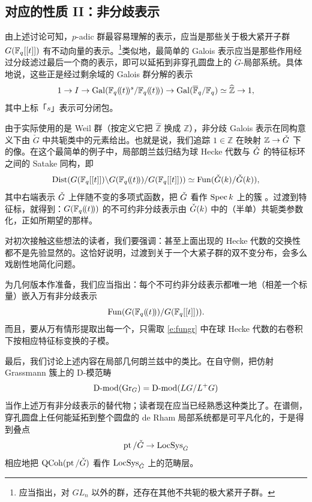 \subsection{对应的性质 II：非分歧表示}

\ssszh 由上述讨论可知，$p$-adic 群最容易理解的表示，应当是那些关于极大紧开子群 $G(\mathbb{F}_q[[t]])$ 有不动向量的表示。\footnote{应当指出，对 $GL_n$ 以外的群，还存在其他不共轭的极大紧开子群。}类似地，最简单的 Galois 表示应当是那些作用经过分歧滤过最后一个商的表示，即可以延拓到非穿孔圆盘上的 $\check{G}$-局部系统。具体地说，这些正是经过剩余域的 Galois 群分解的表示
%
\begin{equation} \label{e:galunramified}
 1 \rightarrow I \rightarrow \operatorname{Gal}( \mathbb{F}_q(\!(t)\!)^s / \mathbb{F}_q(\!(t)\!)) \rightarrow
 \operatorname{Gal}(\overline{\mathbb{F}}_q /
 \mathbb{F}_q) \simeq \widehat{\mathbb{Z}} \rightarrow 1,
\end{equation}
%
其中上标「$s$」表示可分闭包。

由于实际使用的是 Weil 群（按定义它把 $\widehat{\mathbb{Z}}$ 换成 $\mathbb{Z}$），非分歧 Galois 表示在同构意义下由 $\check{G}$ 中共轭类中的元素给出。也就是说，我们追踪 $1 \in \mathbb{Z}$ 在映射 $\mathbb{Z} \rightarrow \check{G}$ 下的像。在这个最简单的例子中，局部朗兰兹归结为球 Hecke 代数与 $\check{G}$ 的特征标环之间的 Satake 同构，即
%
\[    \operatorname{Dist}(G(\mathbb{F}_q[[t]]) \backslash G(\mathbb{F}_q(\!(t)\!)) / G(\mathbb{F}_q[[t]])) \simeq
\operatorname{Fun}(\check{G}(k) / \check{G}(k)),
\]
%
其中右端表示 $\check{G}$ 上伴随不变的多项式函数，把 $\check{G}$ 看作 $\operatorname{Spec} k$ 上的簇 \cite{satake63}。过渡到特征标，就得到：$G(\mathbb{F}_q(\!(t)\!))$ 的不可约非分歧表示由 $\check{G}(k)$ 中的（半单）共轭类参数化，正如所期望的那样。

\begin{re} 对初次接触这些想法的读者，我们要强调：甚至上面出现的 Hecke 代数的交换性都不是先验显然的。这恰好说明，过渡到关于一个大紧子群的双不变分布，会多么戏剧性地简化问题。\end{re}

\ssszh 为几何版本作准备，我们应当指出：每个不可约非分歧表示都唯一地（相差一个标量）嵌入万有非分歧表示
%
\begin{equation} \label{e:fungr}
	    \operatorname{Fun}( G(\mathbb{F}_q(\!(t)\!)) /G(\mathbb{F}_q[[t]])).
\end{equation}
%
而且，要从万有情形提取出每一个，只需取 \eqref{e:fungr} 中在球 Hecke 代数的右卷积下按相应特征标变换的子模。



最后，我们讨论上述内容在局部几何朗兰兹中的类比。在自守侧，把仿射 Grassmann 簇上的 D-模范畴
%
\[
	   \operatorname{D-mod}(\operatorname{Gr}_G) = \operatorname{D-mod}(LG/L^+G)
\]
%
当作上述万有非分歧表示的替代物；读者现在应当已经熟悉这种类比了。在谱侧，穿孔圆盘上任何能延拓到整个圆盘的 de Rham 局部系统都是可平凡化的，于是得到叠点
%
\[
	    \operatorname{pt}/\check{G} \rightarrow \operatorname{LocSys}_{\check{G}}
\]
%
相应地把 $\operatorname{QCoh}( \operatorname{pt}/\check{G})$ 看作 $\operatorname{LocSys}_{\check{G}}$ 上的范畴层。


